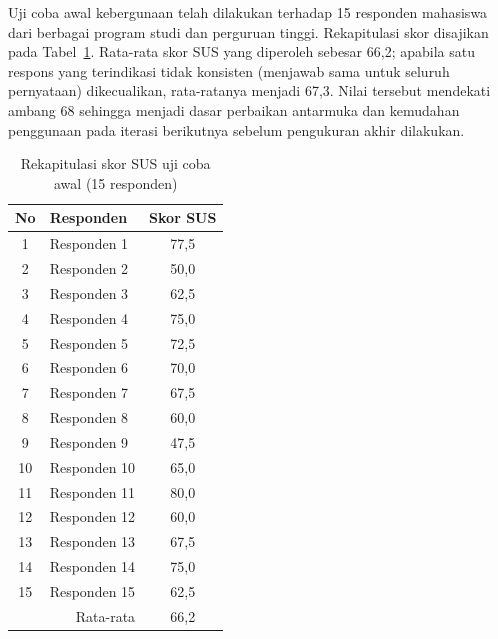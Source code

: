 Uji coba awal kebergunaan telah dilakukan terhadap 15 responden mahasiswa
dari berbagai program studi dan perguruan tinggi. Rekapitulasi skor
disajikan pada Tabel~\ref{tab:sus}. Rata-rata skor SUS yang diperoleh
sebesar 66,2; apabila satu respons yang terindikasi tidak konsisten
(menjawab sama untuk seluruh pernyataan) dikecualikan, rata-ratanya
menjadi 67,3. Nilai tersebut mendekati ambang 68 sehingga menjadi dasar
perbaikan antarmuka dan kemudahan penggunaan pada iterasi berikutnya
sebelum pengukuran akhir dilakukan.

\begin{table}[htbp]
  \centering
  \caption{Rekapitulasi skor SUS uji coba awal (15 responden)}
  \label{tab:sus}
  \small
  \begin{tabular}{@{}clc@{}}
    \toprule
    No & Responden & Skor SUS \\
    \midrule
    1  & Responden 1  & 77,5 \\
    2  & Responden 2  & 50,0 \\
    3  & Responden 3  & 62,5 \\
    4  & Responden 4  & 75,0 \\
    5  & Responden 5  & 72,5 \\
    6  & Responden 6  & 70,0 \\
    7  & Responden 7  & 67,5 \\
    8  & Responden 8  & 60,0 \\
    9  & Responden 9  & 47,5 \\
    10 & Responden 10 & 65,0 \\
    11 & Responden 11 & 80,0 \\
    12 & Responden 12 & 60,0 \\
    13 & Responden 13 & 67,5 \\
    14 & Responden 14 & 75,0 \\
    15 & Responden 15 & 62,5 \\
    \midrule
    \multicolumn{2}{r}{Rata-rata} & 66,2 \\
    \bottomrule
  \end{tabular}
\end{table}
